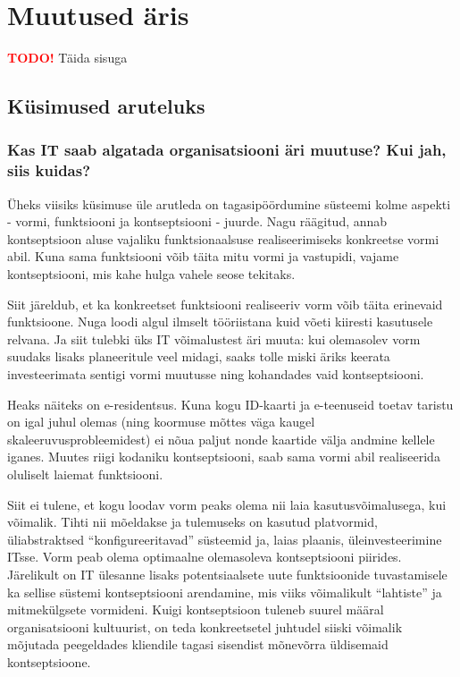 \documentclass{tufte-book}
\newcommand{\TODO}{\textcolor{red}{\bf TODO!}\xspace}
\begin{document}
\chapter{Muutused äris}
\TODO Täida sisuga
\section{Küsimused aruteluks}
\subsection{Kas IT saab algatada organisatsiooni äri muutuse? Kui jah, siis kuidas?}
Üheks viisiks küsimuse üle arutleda on tagasipöördumine süsteemi kolme aspekti - vormi, funktsiooni ja kontseptsiooni - juurde. Nagu räägitud, annab kontseptsioon aluse vajaliku funktsionaalsuse realiseerimiseks konkreetse vormi abil. Kuna sama funktsiooni võib täita mitu vormi ja vastupidi, vajame kontseptsiooni, mis kahe hulga vahele seose tekitaks. 

Siit järeldub, et ka konkreetset funktsiooni realiseeriv vorm võib täita erinevaid funktsioone. Nuga loodi algul ilmselt tööriistana kuid võeti kiiresti kasutusele relvana. Ja siit tulebki üks IT võimalustest äri muuta: kui olemasolev vorm suudaks lisaks planeeritule veel midagi, saaks tolle miski äriks keerata investeerimata sentigi vormi muutusse ning kohandades vaid kontseptsiooni. 

Heaks näiteks on e-residentsus. Kuna kogu ID-kaarti ja e-teenuseid toetav taristu on igal juhul olemas (ning koormuse mõttes väga kaugel skaleeruvusprobleemidest) ei nõua paljut nonde kaartide välja andmine kellele iganes. Muutes riigi kodaniku kontseptsiooni, saab sama vormi abil realiseerida oluliselt laiemat funktsiooni. 

Siit ei tulene, et kogu loodav vorm peaks olema nii laia kasutusvõimalusega, kui võimalik. Tihti nii mõeldakse ja tulemuseks on kasutud platvormid, üliabstraktsed \enquote{konfigureeritavad} süsteemid ja, laias plaanis, üleinvesteerimine ITsse. Vorm peab olema optimaalne olemasoleva kontseptsiooni piirides. Järelikult on IT ülesanne lisaks potentsiaalsete uute funktsioonide tuvastamisele ka sellise süstemi kontseptsiooni arendamine, mis viiks võimalikult \enquote{lahtiste} ja mitmekülgsete vormideni. Kuigi kontseptsioon tuleneb suurel määral organisatsiooni kultuurist, on teda konkreetsetel juhtudel siiski võimalik mõjutada peegeldades kliendile tagasi sisendist mõnevõrra üldisemaid kontseptsioone. 
\end{document}
